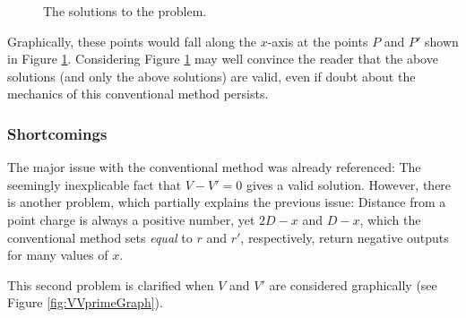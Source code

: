 \documentclass[titlepage]{article}
\begin{document}
\begin{figure}[H]
    \centering
    \caption{The solutions to the problem.}
    \label{fig:2points}
\end{figure}

Graphically, these points would fall along the $x$-axis at the points $P$ and $P'$ shown in Figure \ref{fig:2points}. Considering Figure \ref{fig:2points} may well convince the reader that the above solutions (and only the above solutions) are valid, even if doubt about the mechanics of this conventional method persists.

\subsubsection*{Shortcomings}
The major issue with the conventional method was already referenced: The seemingly inexplicable fact that $V-V'=0$ gives a valid solution. However, there is another problem, which partially explains the previous issue: Distance from a point charge is always a positive number, yet $2D-x$ and $D-x$, which the conventional method sets \emph{equal} to $r$ and $r'$, respectively, return negative outputs for many values of $x$.\par
This second problem is clarified when $V$ and $V'$ are considered graphically (see Figure \ref{fig:VVprimeGraph}).
\end{document}
